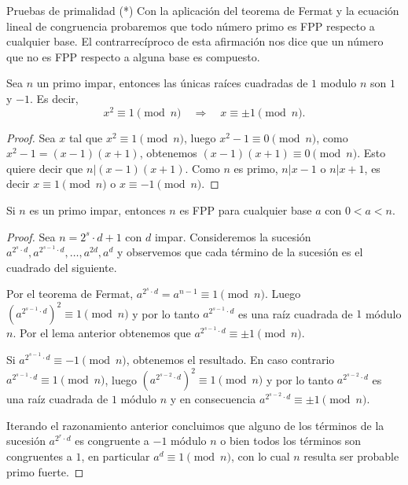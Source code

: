 \begin{section}{Pruebas de primalidad (*)}
Con la aplicación del teorema de Fermat y la ecuación lineal de congruencia probaremos  que todo número primo es FPP respecto a cualquier base. El contrarrecíproco de esta afirmación nos dice que un número que no es FPP respecto a alguna base es compuesto.

\begin{lema}
    Sea $n$  un primo impar, entonces las únicas raíces cuadradas de $1$ modulo $n$ son $1$ y $-1$. Es decir, 
    $$
    x^2 \equiv 1 \pmod{n}  \quad \Rightarrow\quad x \equiv \pm 1 \pmod{n}.
    $$
\end{lema}
\begin{proof}
    Sea $x$ tal que $x^2 \equiv 1 \pmod{n}$, luego $x^2 - 1 \equiv 0 \pmod{n}$, como $x^2 -1 = (x-1)(x+1)$, obtenemos  $(x-1)(x+1) \equiv 0 \pmod{n}$. Esto quiere decir  que $n|  (x-1)(x+1)$. Como $n$  es primo, $n | x -1$ o $n| x +1$, es decir $x  \equiv 1 \pmod{n}$  o $x  \equiv -1 \pmod{n}$.
\end{proof}

\begin{teorema}
    Si $n$ es un primo impar, entonces $n$ es FPP para cualquier base  $a$ con $0 < a < n$.
\end{teorema}
\begin{proof}
    Sea $n = 2^s \cdot d + 1$ con $d$ impar. Consideremos la sucesión $a^{2^s \cdot d}, a^{2^{s-1} \cdot d}, \dots, a^{2d}, a^d$ y  observemos que cada término de la sucesión es el cuadrado del siguiente.

    Por el teorema de Fermat,  $a^{2^s \cdot d} = a^{n-1} \equiv 1 \pmod{n}$. Luego $(a^{2^{s-1} \cdot d})^2 \equiv 1 \pmod{n}$ y por lo tanto $a^{2^{s-1} \cdot d}$ es una raíz cuadrada de $1$ módulo $n$. Por el lema anterior obtenemos  que  $a^{2^{s-1} \cdot d} \equiv \pm 1 \pmod{n}$.

    Si  $a^{2^{s-1} \cdot d} \equiv - 1 \pmod{n}$, obtenemos el resultado.  En caso contrario  $a^{2^{s-1} \cdot d} \equiv 1 \pmod{n}$,  luego $(a^{2^{s-2} \cdot d})^2 \equiv 1 \pmod{n}$ y por lo tanto $a^{2^{s-2} \cdot d}$ es una raíz cuadrada de $1$ módulo $n$ y en consecuencia  $a^{2^{s-2} \cdot d} \equiv \pm 1 \pmod{n}$. 

    Iterando el razonamiento anterior concluimos que alguno de los términos de la sucesión $ a^{2^{r} \cdot d}$  es congruente   a $-1$ módulo $n$ o bien todos los términos son congruentes a $1$,  en particular $a^{d} \equiv 1 \pmod{n}$, con lo cual $n$ resulta ser probable primo fuerte.   
\end{proof}



\end{section}
